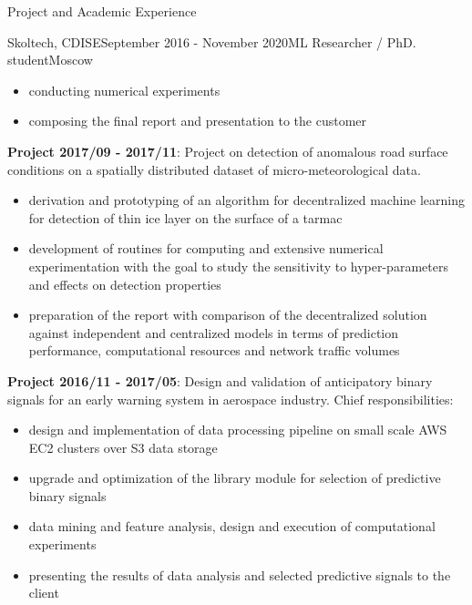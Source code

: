 \documentclass{resume} %
\begin{document}
\begin{rSection}{Project and Academic Experience}
\begin{rSubsection}{Skoltech, CDISE}{September 2016 - November 2020}{ML Researcher / PhD. student}{Moscow}
\begin{itemize}
        \item conducting numerical experiments
        
        \item composing the final report and presentation to the customer
    \end{itemize}

    \medskip
    \item \textbf{Project 2017/09 - 2017/11}:
    Project on detection of anomalous road surface conditions on a spatially distributed
    dataset of micro-meteorological data. \begin{itemize}
        \item derivation and prototyping of an algorithm for decentralized machine
        learning for detection of thin ice layer on the surface of a tarmac
        
        \item development of routines for computing and extensive numerical experimentation
        with the goal to study the sensitivity to hyper-parameters and effects on detection
        properties
        
        \item preparation of the report with comparison of the decentralized solution
        against independent and centralized models in terms of prediction performance,
        computational resources and network traffic volumes
    \end{itemize}

    \medskip
    \item \textbf{Project 2016/11 - 2017/05}: 
    Design and validation of anticipatory binary signals for an early warning system
    in aerospace industry.
    Chief responsibilities: \begin{itemize}
        \item design and implementation of data processing pipeline on small scale
        AWS EC2 clusters over S3 data storage
        
        \item upgrade and optimization of the library module for selection of
        predictive binary signals
        
        \item data mining and feature analysis, design and execution of computational
        experiments
        
        \item presenting the results of data analysis and selected predictive signals
        to the client
    \end{itemize}


\end{rSubsection}
\end{rSection}
\end{document}
